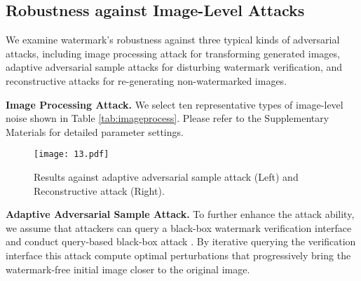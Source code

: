 









\subsection{Robustness against Image-Level Attacks}

We examine watermark's robustness against three typical kinds of adversarial attacks, including image processing attack \cite{song2010analysis} for transforming generated images, adaptive adversarial sample attacks \cite{jiang2023evading} for disturbing watermark verification, and reconstructive attacks \cite{balle2018variational,cheng2020learned,zhao2023invisible} for re-generating non-watermarked images. 





\noindent\textbf{Image Processing Attack.} We select ten representative types of image-level noise shown in Table \ref{tab:imageprocess}. Please refer to the Supplementary Materials for detailed parameter settings. 


\begin{figure}[t]
  \centering
  \texttt{[image: 13.pdf]}
  \caption{
  Results against adaptive adversarial sample attack (Left) and Reconstructive attack (Right).
  }
  \label{Fig:adaptive}
\end{figure}

\noindent\textbf{Adaptive Adversarial Sample Attack.}
To further enhance the attack ability, we assume that attackers can query a black-box watermark verification interface %
and conduct query-based black-box attack \cite{jiang2023evading}. %
By iterative querying the verification interface %
this attack compute optimal perturbations that progressively bring the watermark-free initial image closer to the original image. 


